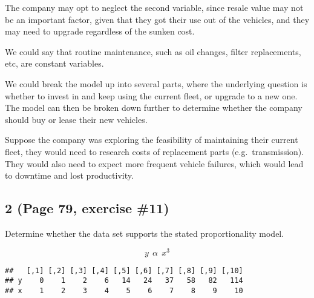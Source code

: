 \documentclass[]{article}
\begin{document}
The company may opt to neglect the second variable, since resale value
may not be an important factor, given that they got their use out of the
vehicles, and they may need to upgrade regardless of the sunken cost.

We could say that routine maintenance, such as oil changes, filter
replacements, etc, are constant variables.

We could break the model up into several parts, where the underlying
question is whether to invest in and keep using the current fleet, or
upgrade to a new one. The model can then be broken down further to
determine whether the company should buy or lease their new vehicles.

Suppose the company was exploring the feasibility of maintaining their
current fleet, they would need to research costs of replacement parts
(e.g.~transmission). They would also need to expect more frequent
vehicle failures, which would lead to downtime and lost productivity.

\hypertarget{page-79-exercise-11}{%
\subsection{2 (Page 79, exercise \#11)}\label{page-79-exercise-11}}

Determine whether the data set supports the stated proportionality
model.

\begin{equation*}
y \ \ \alpha \ \ x^3
\end{equation*}

\begin{verbatim}
##   [,1] [,2] [,3] [,4] [,5] [,6] [,7] [,8] [,9] [,10]
## y    0    1    2    6   14   24   37   58   82   114
## x    1    2    3    4    5    6    7    8    9    10
\end{verbatim}
\end{document}
